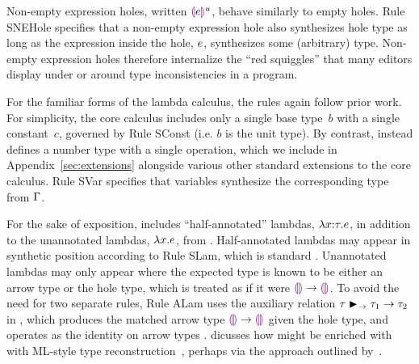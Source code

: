 Non-empty expression holes, written $\textcolor{violet}{\llparenthesis}e\textcolor{violet}{\rrparenthesis}^{u}$, behave similarly to empty holes.
%
Rule {SNEHole} specifies that a non-empty expression hole also synthesizes hole type as long as the expression inside the hole, $e$, synthesizes some (arbitrary) type.
%
Non-empty expression holes therefore internalize the ``red squiggles'' that many editors display under or around type inconsistencies in a program.

For the familiar forms of the lambda calculus, the rules again follow prior work.
%
For simplicity, the core calculus includes only a single base type~$b$ with a single constant~$c$, governed by Rule {SConst} (i.e. $b$ is the unit type).
%
By contrast, \Hazelnut instead defines a number type with a single operation, which we include in Appendix~\ref{sec:extensions} alongside various other standard extensions to the core calculus. 
%
Rule {SVar} specifies that variables synthesize the corresponding type from $\Gamma$. 

For the sake of exposition, \HazelnutLive includes ``half-annotated'' lambdas, $\lambda x{:}\tau.e$, in addition to the unannotated lambdas, $\lambda x.e$, from \Hazelnut.
%
Half-annotated lambdas may appear in synthetic position according to Rule {SLam}, which is standard \cite{Chlipala:2005da}.
%
Unannotated lambdas may only appear where the expected type is known to be either an arrow type or the hole type, which is treated as if it were $\textcolor{violet}{\llparenthesis}\textcolor{violet}{\rrparenthesis} \rightarrow \textcolor{violet}{\llparenthesis}\textcolor{violet}{\rrparenthesis}$.
%
To avoid the need for two separate rules, Rule {ALam} uses the auxiliary relation $\tau \blacktriangleright_{\rightarrow} \tau_1 \rightarrow \tau_2$ in , which produces the matched arrow type $\textcolor{violet}{\llparenthesis}\textcolor{violet}{\rrparenthesis} \rightarrow \textcolor{violet}{\llparenthesis}\textcolor{violet}{\rrparenthesis}$ given the hole type, and operates as the identity on arrow types \cite{DBLP:conf/snapl/SiekVCB15,DBLP:conf/popl/GarciaC15}.
%
 dicusses how \HazelnutLive might be enriched with
with ML-style type reconstruction~\cite{damas1982principal}, perhaps via
the approach outlined by~\citet{DBLP:conf/icfp/DunfieldK13}.
%
%
%

